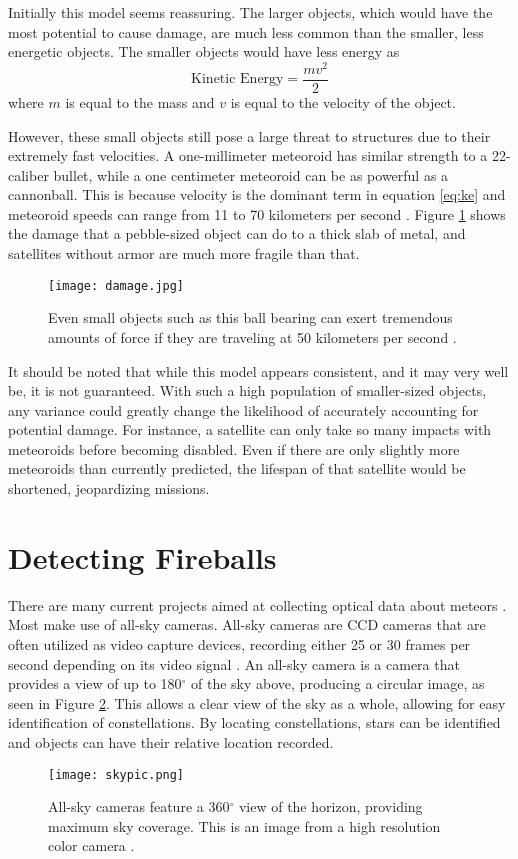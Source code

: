 Initially this model seems reassuring. The larger objects, which would have the most  potential to cause damage, are much less common than the smaller, less energetic objects. The smaller objects would have less energy as 
\begin{equation}
	\textrm{Kinetic Energy} = \frac{mv^2}{2}
	\label{eq:ke}
\end{equation}
where $m$ is equal to the mass and $v$ is equal to the velocity of the object.

However, these small objects still pose a large threat to structures due to their extremely fast velocities. A one-millimeter meteoroid has similar strength to a 22-caliber bullet, while a one centimeter meteoroid can be as powerful as a cannonball. This is because velocity is the dominant term in equation \ref{eq:ke} and meteoroid speeds can range from 11 to 70 kilometers per second \cite{Harbaugh2008}. Figure \ref{fig:damage} shows the damage that a pebble-sized object can do to a thick slab of metal, and satellites without armor are much more fragile than that.

\begin{figure}[ht!]
  \centering
  \texttt{[image: damage.jpg]}
  \caption{Even small objects such as this ball bearing can exert tremendous amounts of force if they are traveling at 50 kilometers per second \protect\cite{ESA2017}.}
  \label{fig:damage}
\end{figure}


It should be noted that while this model appears consistent, and it may very well be, it is not guaranteed. With such a high population of smaller-sized objects, any variance could greatly change the likelihood of accurately accounting for potential damage. For instance, a satellite can only take so many impacts with meteoroids before becoming disabled. Even if there are only slightly more meteoroids than currently predicted, the lifespan of that satellite would be shortened, jeopardizing missions. 

\section{Detecting Fireballs}
There are many current projects aimed at collecting optical data about meteors \cite{Jenniskens2011,Trigo-Rodriguez2007,Halliday1996}. Most make use of all-sky cameras. All-sky cameras are CCD cameras that are often utilized as video capture devices, recording either 25 or 30 frames per second depending on its video signal \cite{Molau2005}. An all-sky camera is a camera that provides a view of up to 180$^{\circ}$ of the sky above, producing a circular image, as seen in Figure \ref{fig:skypic}. This allows a clear view of the sky as a whole, allowing for easy identification of constellations. By locating constellations, stars can be identified and objects can have their relative location recorded. 
\begin{figure}[ht!]
  \centering
  \texttt{[image: skypic.png]}
  \caption{All-sky cameras feature a 360$^{\circ}$ view of the horizon, providing maximum sky coverage. This is an image from a high resolution color camera \protect\cite{Alcor}.}
  \label{fig:skypic}
\end{figure}

